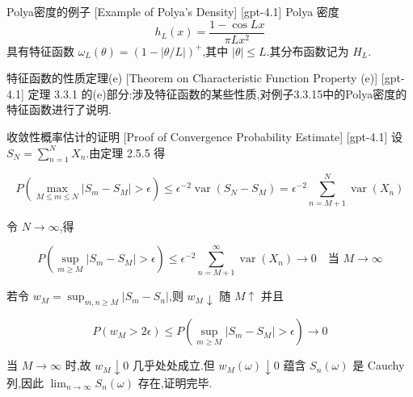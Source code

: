 \documentclass[UTF8]{ctexart}
\begin{document}
    
    
    \begin{xmp}
        {Polya密度的例子}
        [Example of Polya's Density]
        [gpt-4.1]
        Polya 密度
\[
h_{L}(x) = \frac{1 - \cos{Lx}}{\pi L x^{2}}
\]
具有特征函数 $\omega_{L}(\theta) = (1 - |\theta / L|)^{+}$,其中 $|\theta| \le L$.其分布函数记为 $H_{L}$.
    \end{xmp}
    
    
    
    \begin{thm}
        {特征函数的性质定理(e)}
        [Theorem on Characteristic Function Property (e)]
        [gpt-4.1]
        定理 3.3.1 的(e)部分:涉及特征函数的某些性质,对例子3.3.15中的Polya密度的特征函数进行了说明.
    \end{thm}
    
    
    
    \begin{prf}
        {收敛性概率估计的证明}
        [Proof of Convergence Probability Estimate]
        [gpt-4.1]
        设 $S_{N} = \sum_{n=1}^{N} X_{n}$.由定理 2.5.5 得

\[
P\left(\max_{M \leq m \leq N} |S_{m} - S_{M}| > \epsilon\right) \leq \epsilon^{-2} \operatorname{var}(S_{N} - S_{M}) = \epsilon^{-2} \sum_{n=M+1}^{N} \operatorname{var}(X_{n})
\]

令 $N \to \infty$,得

\[
P\left(\sup_{m \ge M} |S_{m} - S_{M}| > \epsilon\right) \le \epsilon^{-2} \sum_{n=M+1}^{\infty} \operatorname{var}\left(X_{n}\right) \to 0 \quad \text{当 } M \to \infty
\]

若令 $w_{M} = \sup_{m, n \geq M} |S_{m} - S_{n}|$,则 $w_{M} \downarrow$ 随 $M \uparrow$ 并且

\[
P(w_{M} > 2\epsilon) \leq P(\sup_{m \geq M} |S_{m} - S_{M}| > \epsilon) \to 0
\]

当 $M \to \infty$ 时,故 $w_{M} \downarrow 0$ 几乎处处成立.但 $w_{M}(\omega) \downarrow 0$ 蕴含 $S_{n}(\omega)$ 是 Cauchy 列,因此 $\lim_{n \to \infty} S_{n}(\omega)$ 存在,证明完毕.
    \end{prf}
    
    
    
\end{document}
